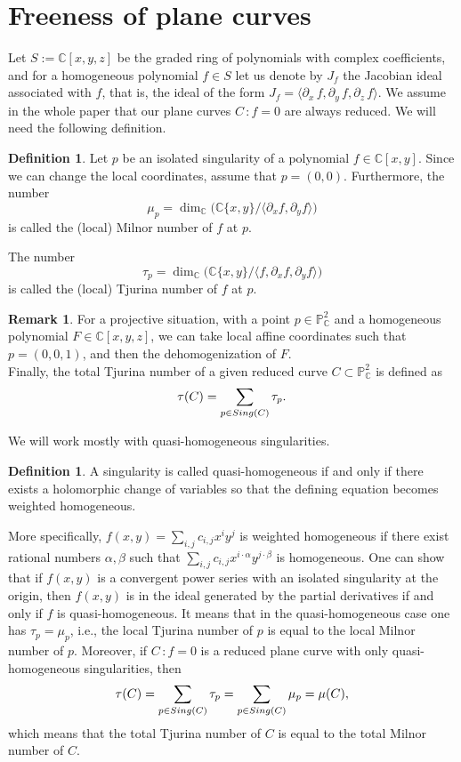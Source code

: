 \documentclass[12pt]{article}
\theoremstyle{plain}
\theoremstyle{definition}
\newtheorem{definition}[thm]{Definition}
\newtheorem{remark}[thm]{Remark}
\begin{document}
\section{Freeness of plane curves}
Let $S := \mathbb{C}[x,y,z]$ be the graded ring of polynomials with complex coefficients, and for a homogeneous polynomial $f \in S$ let us denote by $J_{f}$ the Jacobian ideal associated with $f$, that is, the ideal of the form $J_{f} = \langle \partial_{x}\, f, \partial_{y} \, f, \partial_{z} \, f \rangle$. 
We assume in the whole paper that our plane curves $C \, : f=0$ are always reduced. We will need the following definition.
\begin{definition}
Let $p$ be an isolated singularity of a polynomial $f\in \mathbb{C}[x,y]$. Since we can change the local coordinates, assume that $p=(0,0)$.
Furthermore, the number 
$$\mu_{p}=\dim_\mathbb{C}\bigg( \mathbb{C} \{x,y \} / \langle \partial_{x} f, \partial_{y} f \rangle \bigg)$$
is called the (local) Milnor number of $f$ at $p$.

The number
$$\tau_{p}=\dim_\mathbb{C} \bigg( \mathbb{C}\{x, y\} / \langle f, \partial_{x} f, \partial_{y} f \rangle \bigg)$$
is called the (local) Tjurina number of $f$ at $p$.
\end{definition}
\begin{remark}
For a projective situation, with a point $p\in \mathbb{P}^{2}_{\mathbb{C}}$ and a homogeneous polynomial $F\in \mathbb{C}[x,y,z]$, we can take local affine coordinates such that $p=(0,0,1)$, and then the dehomogenization of $F$.\\
Finally, the total Tjurina number of a given reduced curve $C \subset \mathbb{P}^{2}_{\mathbb{C}}$ is defined as
$$\tau(C) = \sum_{p \in {\rm Sing}(C)} \tau_{p}.$$ 
\end{remark}
We will work mostly with quasi-homogeneous singularities.
\begin{definition}
A singularity is called quasi-homogeneous if and only if there exists a holomorphic change of variables so that the defining equation becomes weighted homogeneous.
\end{definition}
 More specifically, $f(x,y) = \sum_{i,j}c_{i,j}x^{i}y^{j}$ is weighted homogeneous if there exist rational numbers $\alpha, \beta$ such that $\sum_{i,j} c_{i,j}x^{i\cdot \alpha} y^{j \cdot \beta}$ is homogeneous. One can show that if $f(x,y)$ is a convergent power series with an isolated singularity at the origin, then $f(x,y)$ is in the ideal generated by the partial derivatives if and only if $f$ is quasi-homogeneous. It means that in the quasi-homogeneous case one has $\tau_{p} = \mu_{p}$, i.e., the local Tjurina number of $p$ is equal to the local Milnor number of $p$. Moreover, if $C \, : f=0$ is a reduced plane curve with only quasi-homogeneous singularities, then
$$\tau(C) = \sum_{p \in {\rm Sing}(C)} \tau_{p} = \sum_{p \in {\rm Sing}(C)} \mu_{p} = \mu(C),$$ which means that the total Tjurina number of $C$ is equal to the total Milnor number of $C$.
\end{document}
